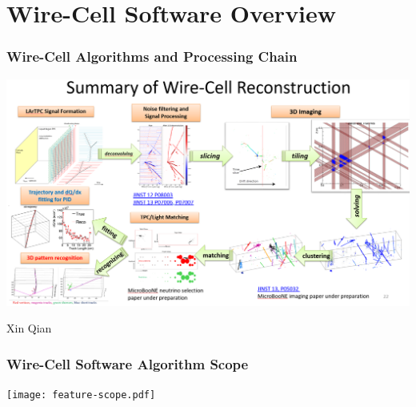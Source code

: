 \documentclass[xcolor=dvipsnames]{beamer}
\begin{document}



\section{Wire-Cell Software Overview}

\begin{frame}
  \frametitle{Wire-Cell Algorithms and Processing Chain}

  \begin{center}
    \includegraphics[width=\textwidth,clip,trim=0 0 0 3cm]{summary-of-wc-reco-noboxes.png}

    \tiny Xin Qian
  \end{center}

\end{frame}

\begin{frame}
  \frametitle{Wire-Cell Software Algorithm Scope}
  \begin{center}
  \texttt{[image: feature-scope.pdf]}    
  \end{center}
\end{frame}
\end{document}
